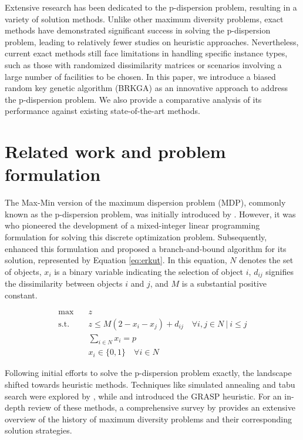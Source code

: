 \documentclass[preprint,12pt]{elsarticle}
\begin{document}
Extensive research has been dedicated to the p-dispersion problem, resulting in a variety of solution methods. Unlike other maximum diversity problems, exact methods have demonstrated significant success in solving the p-dispersion problem, leading to relatively fewer studies on heuristic approaches. Nevertheless, current exact methods still face limitations in handling specific instance types, such as those with randomized dissimilarity matrices or scenarios involving a large number of facilities to be chosen. In this paper, we introduce a biased random key genetic algorithm (BRKGA) \cite{Goncalves2011-kp} as an innovative approach to address the p-dispersion problem. We also provide a comparative analysis of its performance against existing state-of-the-art methods.


\section{Related work and problem formulation}
The Max-Min version of the maximum dispersion problem (MDP), commonly known as the p-dispersion problem, was initially introduced by \citet{Moon1984-zi}. However, it was \citet{Kuby1988-ii} who pioneered the development of a mixed-integer linear programming formulation for solving this discrete optimization problem. Subsequently, \citet{Erkut1990-mo} enhanced this formulation and proposed a branch-and-bound algorithm for its solution, represented by Equation \ref{eq:erkut}. In this equation, $N$ denotes the set of objects, $x_i$ is a binary variable indicating the selection of object $i$, $d_{ij}$ signifies the dissimilarity between objects $i$ and $j$, and $M$ is a substantial positive constant.

\begin{equation}
    \label{eq:erkut}
    \begin{aligned}
        \max \quad & z \\
        \text{s.t.} \quad & z \leq M(2 - x_i - x_j) + d_{ij} \quad \forall i,j \in N \ | \ i \leq j \\
        & \sum_{i \in N} x_i = p \\
        & x_i \in \{0,1\} \quad \forall i \in N
    \end{aligned}
\end{equation}

Following initial efforts to solve the p-dispersion problem exactly, the landscape shifted towards heuristic methods. Techniques like simulated annealing and tabu search were explored by \citet{Kincaid1992-mp}, while \citet{Ghosh1996-zm} and \citet{Resende2010-vr} introduced the GRASP heuristic. For an in-depth review of these methods, a comprehensive survey by \citet{Marti2022-ku} provides an extensive overview of the history of maximum diversity problems and their corresponding solution strategies.
\end{document}
